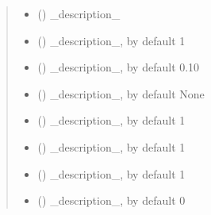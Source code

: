 \documentclass[letterpaper,10pt,english]{sphinxmanual}
\begin{document}
\begin{fulllineitems}
\begin{fulllineitems}
\begin{quote}
\begin{description}
\begin{itemize}
\item {} 
\sphinxAtStartPar
{} () \textendash{} \_description\_

\item {} 
\sphinxAtStartPar
{} (\sphinxstyleliteralemphasis{\sphinxupquote{, }}) \textendash{} \_description\_, by default 1

\item {} 
\sphinxAtStartPar
{} (\sphinxstyleliteralemphasis{\sphinxupquote{, }}) \textendash{} \_description\_, by default \sphinxhyphen{}0.10

\item {} 
\sphinxAtStartPar
{} (\sphinxstyleliteralemphasis{\sphinxupquote{, }}) \textendash{} \_description\_, by default None

\item {} 
\sphinxAtStartPar
{} (\sphinxstyleliteralemphasis{\sphinxupquote{, }}) \textendash{} \_description\_, by default 1

\item {} 
\sphinxAtStartPar
{} (\sphinxstyleliteralemphasis{\sphinxupquote{, }}) \textendash{} \_description\_, by default 1

\item {} 
\sphinxAtStartPar
{} (\sphinxstyleliteralemphasis{\sphinxupquote{, }}) \textendash{} \_description\_, by default 1

\item {} 
\sphinxAtStartPar
{} (\sphinxstyleliteralemphasis{\sphinxupquote{, }}) \textendash{} \_description\_, by default 0


\end{itemize}
\end{description}
\end{quote}
\end{fulllineitems}
\end{fulllineitems}
\end{document}
